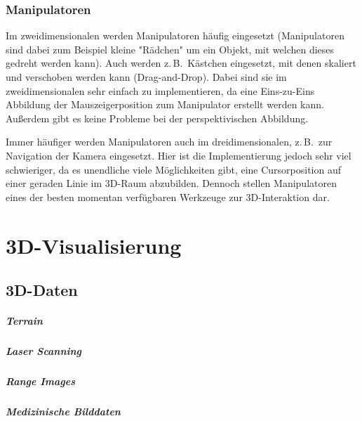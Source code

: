 \documentclass[a4paper, 11pt, accentcolor = tud3b]{tudreport}
\newcommand{\zB}{z.\,B.~}
\begin{document}
			\subsection{Manipulatoren}
				Im zweidimensionalen werden Manipulatoren häufig eingesetzt (Manipulatoren sind dabei zum Beispiel kleine "Rädchen" um ein Objekt, mit welchen dieses gedreht werden kann). Auch werden \zB Kästchen eingesetzt, mit denen skaliert und verschoben werden kann (Drag-and-Drop). Dabei sind sie im zweidimensionalen sehr einfach zu implementieren, da eine Eins-zu-Eins Abbildung der Mauszeigerposition zum Manipulator erstellt werden kann. Außerdem gibt es keine Probleme bei der perspektivischen Abbildung.
				
				Immer häufiger werden Manipulatoren auch im dreidimensionalen, \zB zur Navigation der Kamera eingesetzt. Hier ist die Implementierung jedoch sehr viel schwieriger, da es unendliche viele Möglichkeiten gibt, eine Cursorposition auf einer geraden Linie im 3D-Raum abzubilden. Dennoch stellen Manipulatoren eines der besten momentan verfügbaren Werkzeuge zur 3D-Interaktion dar.

	\chapter{3D-Visualisierung} %

		\section{3D-Daten} %

			\paragraph{Terrain} %

			\paragraph{Laser Scanning} %

			\paragraph{Range Images} %

			\paragraph{Medizinische Bilddaten} %
\end{document}
